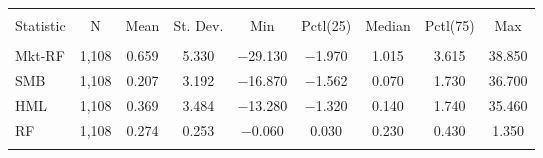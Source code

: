 
\begin{tabular}{@{\extracolsep{5pt}}lcccccccc} 
\\[-1.8ex]\hline \\[-1.8ex] 
Statistic & \multicolumn{1}{c}{N} & \multicolumn{1}{c}{Mean} & \multicolumn{1}{c}{St. Dev.} & \multicolumn{1}{c}{Min} & \multicolumn{1}{c}{Pctl(25)} & \multicolumn{1}{c}{Median} & \multicolumn{1}{c}{Pctl(75)} & \multicolumn{1}{c}{Max} \\ 
\hline 
\hline \\[-1.8ex] 
Mkt-RF & 1,108 & 0.659 & 5.330 & $-$29.130 & $-$1.970 & 1.015 & 3.615 & 38.850 \\ 
SMB & 1,108 & 0.207 & 3.192 & $-$16.870 & $-$1.562 & 0.070 & 1.730 & 36.700 \\ 
HML & 1,108 & 0.369 & 3.484 & $-$13.280 & $-$1.320 & 0.140 & 1.740 & 35.460 \\ 
RF & 1,108 & 0.274 & 0.253 & $-$0.060 & 0.030 & 0.230 & 0.430 & 1.350 \\ 
\hline 
\hline \\[-1.8ex] 
\end{tabular} 
